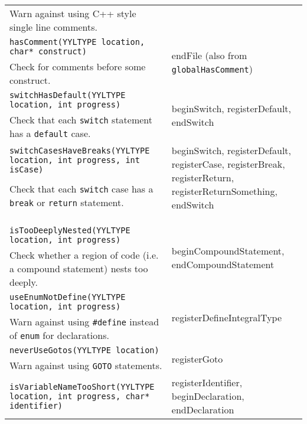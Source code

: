 \documentclass[12pt]{report}
\begin{document}
\begin{longtable}{p{9.5cm} p{\saxColSize}}
		Warn against using C++ style single line comments. \vspace{\vertSize} \\
		\lstinline!hasComment(YYLTYPE location, char* construct)!  & \multirow{2}{\saxColSize}{endFile (also from \lstinline!globalHasComment!)} \\*
			 Check for comments before some construct. \vspace{\vertSize} \\
		\lstinline!switchHasDefault(YYLTYPE location, int progress)! & \multirow{2}{\saxColSize}{beginSwitch, registerDefault, endSwitch} \\*
		 Check that each \lstinline!switch! statement has a \lstinline!default! case. \vspace{\vertSize} \\ 
		\lstinline!switchCasesHaveBreaks(YYLTYPE location, int progress, int isCase)! & \multirow{2}{\saxColSize}{beginSwitch, registerDefault, registerCase, registerBreak, registerReturn, registerReturnSomething, endSwitch} \\*
		 Check that each \lstinline!switch! case has a \lstinline!break! or \lstinline!return! statement. \vspace{\vertSize} \\ \\ \\ \\
		\lstinline!isTooDeeplyNested(YYLTYPE location, int progress)! & \multirow{2}{\saxColSize}{beginCompoundStatement, endCompoundStatement} \\*
		 Check whether a region of code (i.e. a compound statement) nests too deeply. \vspace{\vertSize} \\
		\lstinline!useEnumNotDefine(YYLTYPE location, int progress)! & \multirow{2}{\saxColSize}{registerDefineIntegralType} \\*
			 Warn against using \lstinline!#define! instead of \lstinline!enum! for declarations. \vspace{\vertSize} \\
		\lstinline!neverUseGotos(YYLTYPE location)! & \multirow{2}{\saxColSize}{registerGoto} \\*
			 Warn against using \lstinline!GOTO! statements. \vspace{\vertSize} \\
		\lstinline!isVariableNameTooShort(YYLTYPE location, int progress, char* identifier)! & \multirow{2}{\saxColSize}{registerIdentifier, beginDeclaration, endDeclaration} \\*

\end{longtable}
\end{document}
